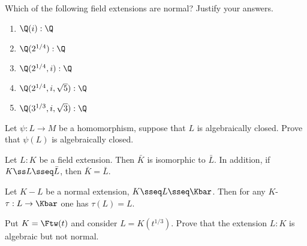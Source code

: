 \documentclass{article}
\begin{document}
\setcounter{section}{5} %
\begin{exercise}
Which of the following field extensions are normal? Justify your answers.
\end{exercise}
\begin{enumerate}
  \item $ \Q(i):\Q $
  \begin{solution}

  \end{solution}

  \item $ \Q(2^{1/4}):\Q $
  \begin{solution}

  \end{solution}

  \item $ \Q(2^{1/4},i):\Q $
  \begin{solution}

  \end{solution}

  \item $ \Q(2^{1/4},i,\sqrt 5):\Q $
  \begin{solution}

  \end{solution}

  \item $ \Q(3^{1/3},i,\sqrt 3):\Q $
  \begin{solution}

  \end{solution}
\end{enumerate}

\begin{exercise}
  Let $ \psi:L \to M $ be a homomorphism, suppose that $ L $ is algebraically closed.
  Prove that $ \psi(L) $ is algebraically closed.
\end{exercise}
\begin{solution}

\end{solution}

\begin{exercise}
  Let $ L:K $ be a field extension. Then $ \bar K $ is isomorphic to $ \bar L $.
  In addition, if $ K\ss L \sseq \bar L $, then $ \bar K = \bar L $.
\end{exercise}
\begin{solution}

\end{solution}

\begin{exercise}
  Let $ K-L $ be a normal extension, $ K\sseq L\sseq \Kbar $.
  Then for any $ K $-\homo $ \tau:L\to \Kbar $ one has $ \tau(L) = L $.
\end{exercise}
\begin{solution}

\end{solution}

\begin{exercise}
  Put $ K=\Ftw(t) $ and consider $ L=K(t^{1/3}) $.
  Prove that the extension $ L:K $ is algebraic but not normal.
\end{exercise}
\end{document}
